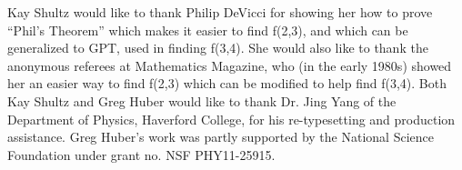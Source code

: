 Kay Shultz would like to thank Philip DeVicci for showing her how to prove
``Phil's Theorem'' which makes it easier to find f(2,3), and which can be
generalized to GPT, used in finding f(3,4). She would also like to thank
the anonymous referees at Mathematics Magazine, who (in the early 1980s)
showed her an easier way to find f(2,3) which can be modified to help find
f(3,4). Both Kay Shultz and Greg Huber would like to thank Dr. Jing Yang of
the Department of Physics, Haverford College, for his re-typesetting and
production assistance. Greg Huber's work was partly supported by the
National Science Foundation under grant no. NSF PHY11-25915.
